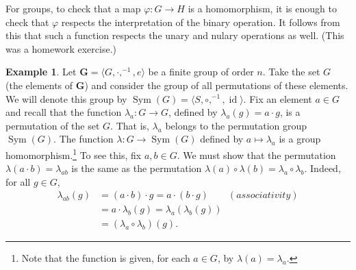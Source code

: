 \documentclass[12pt]{article}
\theoremstyle{plain}
\theoremstyle{definition}
\newtheorem{example}[theorem]{Example}
\theoremstyle{remark}
\theoremstyle{remark}
\numberwithin{theorem}{section}
\numberwithin{equation}{section}
\newcommand{\<}{\ensuremath{\langle}}
\renewcommand{\>}{\ensuremath{\rangle}}
\newcommand{\id}{\ensuremath{\operatorname{id}}}       %
\newcommand{\Sym}{\ensuremath{\operatorname{Sym}}}
\newcommand{\bG}{\ensuremath{\mathbf{G}}}
\begin{document}
\medskip
{} For groups, to check that a map $\varphi: G \rightarrow H$ is a
homomorphism, it is enough to check that $\varphi$ respects the interpretation
of the binary operation. It follows from this that such a function respects the
unary and nulary operations as well. (This was a homework exercise.)



\begin{example}
Let $\bG = \<G, \cdot, ^{-1}, e\>$ be a finite group of order $n$.  
Take the set $G$ (the elements of $\bG$) and consider the group of all
permutations of these elements.  We will denote this group by
$\Sym(G) = \<S, \circ, ^{-1}, \id\>$.
Fix an element $a\in G$ and recall that the function
$\lambda_a: G \rightarrow G$, defined by $\lambda_a(g) = a\cdot g$, is a
permutation of the set $G$.  That is, $\lambda_a$ belongs to the
permutation group $\Sym(G)$.  
The function $\lambda: G \rightarrow \Sym(G)$ defined by 
$a\mapsto \lambda_a$ is a group homomorphism.\footnote{Note that the function
is given, for each $a\in G$, by $\lambda(a) = \lambda_a$.}
To see this, fix $a, b \in G$.  We must show that
the permutation 
$\lambda(a\cdot b) = \lambda_{ab}$
is the same as the permutation 
$\lambda(a) \circ \lambda(b) = \lambda_a \circ \lambda_b$.
Indeed, for all $g \in G$,
\begin{align*}
\lambda_{ab} (g) &= (a\cdot b) \cdot g = a \cdot (b \cdot g) \qquad (associativity)\\
&= a \cdot \lambda_b(g) = \lambda_a (\lambda_b(g)) \\
& = (\lambda_a \circ \lambda_b)(g).
\end{align*}
\end{example}
\end{document}
